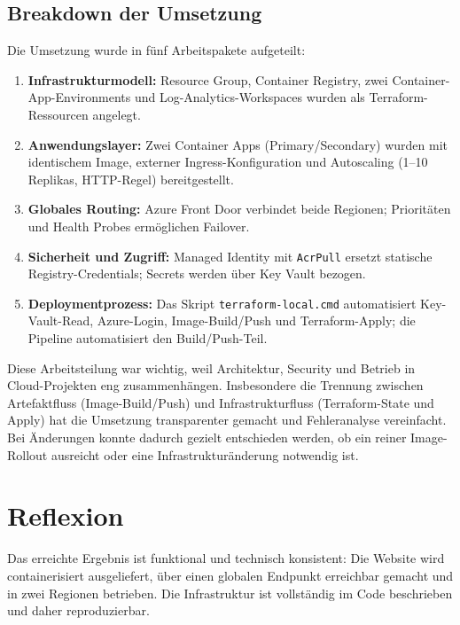 \documentclass[a4paper,11pt]{article}
\begin{document}
\subsection*{Breakdown der Umsetzung}
Die Umsetzung wurde in fünf Arbeitspakete aufgeteilt:
\begin{enumerate}
  \item \textbf{Infrastrukturmodell:} Resource Group, Container Registry, zwei Container-App-Environments und Log-Analytics-Workspaces wurden als Terraform-Ressourcen angelegt.
  \item \textbf{Anwendungslayer:} Zwei Container Apps (Primary/Secondary) wurden mit identischem Image, externer Ingress-Konfiguration und Autoscaling (1--10 Replikas, HTTP-Regel) bereitgestellt.
  \item \textbf{Globales Routing:} Azure Front Door verbindet beide Regionen; Prioritäten und Health Probes ermöglichen Failover.
  \item \textbf{Sicherheit und Zugriff:} Managed Identity mit \texttt{AcrPull} ersetzt statische Registry-Credentials; Secrets werden über Key Vault bezogen.
  \item \textbf{Deploymentprozess:} Das Skript \texttt{terraform-local.cmd} automatisiert Key-Vault-Read, Azure-Login, Image-Build/Push und Terraform-Apply; die Pipeline automatisiert den Build/Push-Teil.
\end{enumerate}
Diese Arbeitsteilung war wichtig, weil Architektur, Security und Betrieb in Cloud-Projekten eng zusammenhängen.
Insbesondere die Trennung zwischen Artefaktfluss (Image-Build/Push) und Infrastrukturfluss (Terraform-State und Apply)
hat die Umsetzung transparenter gemacht und Fehleranalyse vereinfacht.
Bei Änderungen konnte dadurch gezielt entschieden werden, ob ein reiner Image-Rollout ausreicht oder eine Infrastrukturänderung notwendig ist.

\section*{Reflexion}

Das erreichte Ergebnis ist funktional und technisch konsistent:
Die Website wird containerisiert ausgeliefert, über einen globalen Endpunkt erreichbar gemacht und in zwei Regionen betrieben.
Die Infrastruktur ist vollständig im Code beschrieben und daher reproduzierbar.
\end{document}
